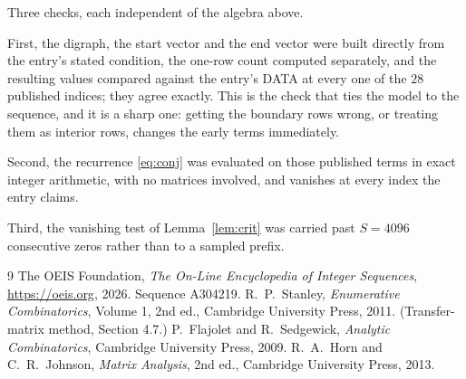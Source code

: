 \documentclass[11pt,a4paper]{article}
\theoremstyle{plain}
\theoremstyle{definition}
\begin{document}
Three checks, each independent of the algebra above.

First, the digraph, the start vector and the end vector were built directly from the
entry's stated condition, the one-row count computed separately, and the resulting values
compared against the entry's DATA at every one of the $28$ published indices; they
agree exactly. This is the check that ties the model to the sequence, and it is a sharp one:
getting the boundary rows wrong, or treating them as interior rows, changes the early terms
immediately.

Second, the recurrence \eqref{eq:conj} was evaluated on those published terms in exact
integer arithmetic, with no matrices involved, and vanishes at every index the entry claims.

Third, the vanishing test of Lemma~\ref{lem:crit} was carried past $S=4096$ consecutive
zeros rather than to a sampled prefix.

\begin{thebibliography}{9}
 The OEIS Foundation, \emph{The On-Line Encyclopedia of Integer
Sequences}, \url{https://oeis.org}, 2026. Sequence A304219.
 R.~P.~Stanley, \emph{Enumerative Combinatorics}, Volume 1, 2nd ed.,
Cambridge University Press, 2011. (Transfer-matrix method, Section 4.7.)
 P.~Flajolet and R.~Sedgewick, \emph{Analytic Combinatorics}, Cambridge
University Press, 2009.
 R.~A.~Horn and C.~R.~Johnson, \emph{Matrix Analysis}, 2nd ed., Cambridge
University Press, 2013.
\end{thebibliography}
\end{document}
